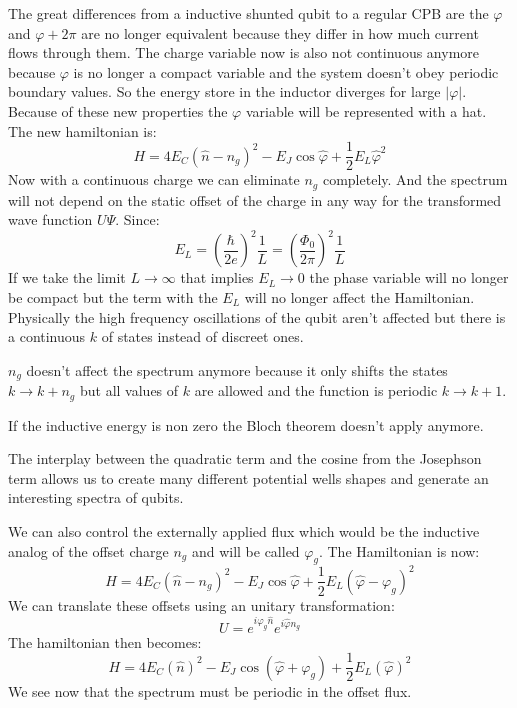 \documentclass[12pt]{article}
\numberwithin{equation}{subsection}
\newcommand\ask[1]{
{%
}
}
\newcommand\page[1]{
{
}
}
\begin{document}
The great differences from a inductive shunted qubit to a regular CPB are the $\varphi$ and $\varphi + 2\pi$ are no longer equivalent because they differ in how much current flows through them. 
The charge variable now is also not continuous anymore because $\varphi$ is no longer a compact variable and the system doesn't obey periodic boundary values. So the energy store in the inductor diverges for large $|\varphi|$. Because of these new properties the $\varphi$ variable will be represented with a hat. The new hamiltonian is:
\begin{equation}
    H = 4E_C(\hat n -n_g)^2 - E_J\cos\hat\varphi + \frac{1}{2} E_L\hat \varphi^2
\end{equation}
Now with a continuous charge we can eliminate $n_g$ completely. And the spectrum will not depend on the static offset of the charge in any way for the transformed wave function $U\Psi$.
Since:
\begin{equation}
    E_L = \left ( \frac{\hbar}{2e}\right)^2\frac{1}{L} =  \left ( \frac{\Phi_0}{2\pi}\right)^2\frac{1}{L}
\end{equation}
If we take the limit $L \rightarrow \infty$ that implies $E_L \rightarrow 0$ the phase variable will no longer be compact but the term with the $E_L$ will no longer affect the Hamiltonian. Physically the high frequency oscillations of the qubit aren't affected but there is a continuous $k$ of states instead of discreet ones.

 $n_g$ doesn't affect the spectrum anymore because it only shifts the states $k \rightarrow k+n_g$ but all values of $k$ are allowed and the function is periodic $k\rightarrow k+1$.

\page{57}

If the inductive energy is non zero the Bloch theorem doesn't apply anymore. 
\ask{?}
The interplay between the quadratic term and the cosine from the Josephson term allows us to create many different potential wells shapes and generate an interesting spectra of qubits.

We can also control the externally applied flux which would be the inductive analog of the offset charge $n_g$ and will be called $\varphi_g$. The Hamiltonian is now:
\begin{equation}
    H = 4E_C(\hat n -n_g)^2 - E_J\cos\hat\varphi + \frac{1}{2} E_L(\hat \varphi - \varphi_g)^2
\end{equation}
We can translate these offsets using an unitary transformation:
\begin{equation}
    U=e^{i\varphi_g\hat n}e^{i\hat \varphi n_g}
\end{equation}
The hamiltonian then becomes:
\begin{equation}
    H = 4E_C(\hat n)^2 - E_J\cos(\hat\varphi+\varphi_g) + \frac{1}{2} E_L(\hat \varphi)^2
\end{equation}
We see now that the spectrum must be periodic in the offset flux.
\end{document}
